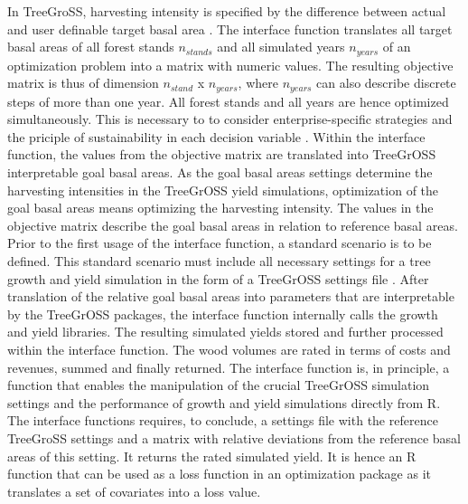 In TreeGroSS, harvesting intensity is specified by the difference between actual and user definable target basal area \citep[p. 149-150]{hansen_2014}. The interface function translates all target basal areas of all forest stands $n_{stands}$ and all simulated years $n_{years}$ of an optimization problem into a matrix with numeric values. The resulting objective matrix is thus of dimension $n_{stand}$ x $n_{years}$, where $n_{years}$ can also describe discrete steps of more than one year. All forest stands and all years are hence optimized simultaneously. This is necessary to to consider enterprise-specific strategies and the priciple of sustainability in each decision variable \citep[p. 351]{mohring_2010}. Within the interface function, the values from the objective matrix are translated into TreeGrOSS interpretable goal basal areas. As the goal basal areas settings determine the harvesting intensities in the TreeGrOSS yield simulations, optimization of the goal basal areas means optimizing the harvesting intensity. The values in the objective matrix describe the goal basal areas in relation to reference basal areas. Prior to the first usage of the interface function, a standard scenario is to be defined. This standard scenario must include all necessary settings for a tree growth and yield simulation in the form of a TreeGrOSS settings file \citep[p. 30]{hansen_2014}. After translation of the relative goal basal areas into parameters that are interpretable by the TreeGrOSS packages, the interface function internally calls the growth and yield libraries. The resulting simulated yields stored and further processed within the interface function. The wood volumes are rated in terms of costs and revenues, summed and finally returned. The interface function is, in principle, a function that enables the manipulation of the crucial TreeGrOSS simulation settings and the performance of growth and yield simulations directly from R. The interface functions requires, to conclude, a settings file with the reference TreeGroSS settings and a matrix with relative deviations from the reference basal areas of this setting. It returns the rated simulated yield. It is hence an R function that can be used as a loss function in an optimization package as it translates a set of covariates into a loss value.

